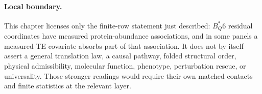 \paragraph{Local boundary.}
This chapter licenses only the finite-row statement just described: $B^*_Q6$ residual coordinates have measured protein-abundance associations, and in some panels a measured TE covariate absorbs part of that association. It does not by itself assert a general translation law, a causal pathway, folded structural order, physical admissibility, molecular function, phenotype, perturbation rescue, or universality. Those stronger readings would require their own matched contacts and finite statistics at the relevant layer.